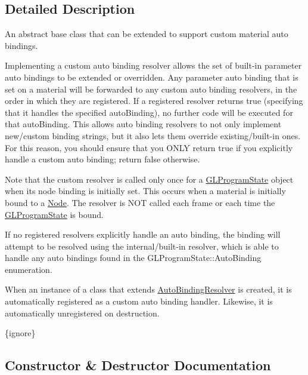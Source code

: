 \subsection{Detailed Description}
An abstract base class that can be extended to support custom material auto bindings.

Implementing a custom auto binding resolver allows the set of built-\/in parameter auto bindings to be extended or overridden. Any parameter auto binding that is set on a material will be forwarded to any custom auto binding resolvers, in the order in which they are registered. If a registered resolver returns true (specifying that it handles the specified auto\+Binding), no further code will be executed for that auto\+Binding. This allows auto binding resolvers to not only implement new/custom binding strings, but it also lets them override existing/built-\/in ones. For this reason, you should ensure that you O\+N\+LY return true if you explicitly handle a custom auto binding; return false otherwise.

Note that the custom resolver is called only once for a \hyperlink{classGLProgramState}{G\+L\+Program\+State} object when its node binding is initially set. This occurs when a material is initially bound to a \hyperlink{classNode}{Node}. The resolver is N\+OT called each frame or each time the \hyperlink{classGLProgramState}{G\+L\+Program\+State} is bound.

If no registered resolvers explicitly handle an auto binding, the binding will attempt to be resolved using the internal/built-\/in resolver, which is able to handle any auto bindings found in the G\+L\+Program\+State\+::\+Auto\+Binding enumeration.

When an instance of a class that extends \hyperlink{classGLProgramState_1_1AutoBindingResolver}{Auto\+Binding\+Resolver} is created, it is automatically registered as a custom auto binding handler. Likewise, it is automatically unregistered on destruction.

\{ignore\} 

\subsection{Constructor \& Destructor Documentation}
\mbox{\label{classGLProgramState_1_1AutoBindingResolver_ac396b30720f4b0cbbdc9f696f55cea8c}} 
